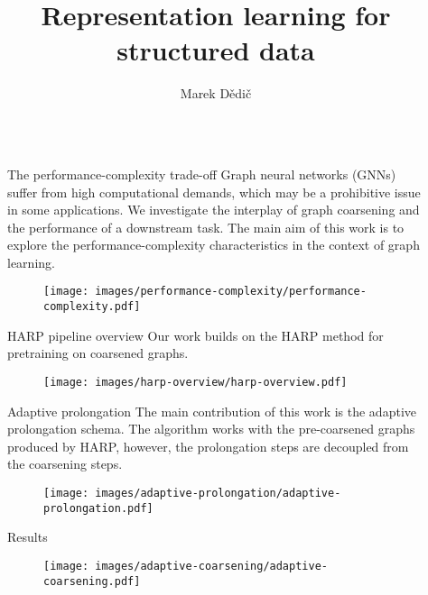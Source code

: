 \documentclass{beamer}
\title{Representation learning for structured data}
\author{%
	Marek Dědič\inst{1 2}
}
\institute{%
	\inst{1} Czech Technical University in Prague \samelineand
	\inst{2} Cisco Systems, Inc.
}
\newlength{\sepwidth}
\newlength{\colwidth}
\newcommand{\separatorcolumn}{\begin{column}{\sepwidth}\end{column}}
\begin{document}
\begin{frame}[fragile,t]

\begin{columns}[t]
	\separatorcolumn

	\begin{column}{\colwidth}
		\begin{block}{The performance-complexity trade-off}
			Graph neural networks (GNNs) suffer from high computational demands, which may be a prohibitive issue in some applications. We investigate the interplay of graph coarsening and the performance of a downstream task. The main aim of this work is to explore the performance-complexity characteristics in the context of graph learning.
			\begin{figure}
				\texttt{[image: images/performance-complexity/performance-complexity.pdf]}
			\end{figure}
		\end{block}

		\begin{block}{HARP pipeline overview}
			Our work builds on the HARP method for pretraining on coarsened graphs.
			\begin{figure}
				\texttt{[image: images/harp-overview/harp-overview.pdf]}
			\end{figure}
		\end{block}

		\begin{block}{Adaptive prolongation}
			The main contribution of this work is the adaptive prolongation schema. The algorithm works with the pre-coarsened graphs produced by HARP, however, the prolongation steps are decoupled from the coarsening steps.
			\begin{figure}
				\texttt{[image: images/adaptive-prolongation/adaptive-prolongation.pdf]}
			\end{figure}
		\end{block}

		\begin{block}{Results}
			\begin{figure}
				\texttt{[image: images/adaptive-coarsening/adaptive-coarsening.pdf]}
			\end{figure}
		\end{block}
	\end{column}

	\separatorcolumn


\end{columns}
\end{frame}
\end{document}
